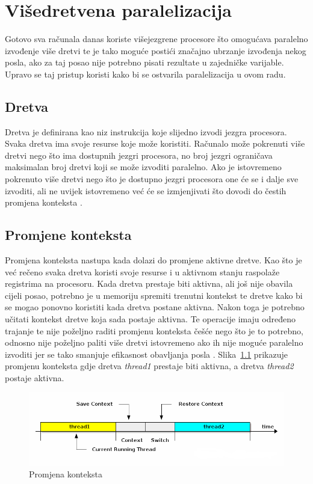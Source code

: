 \documentclass[times, utf8, zavrsni]{fer}
\begin{document}
\chapter{Višedretvena paralelizacija}
Gotovo sva računala danas koriste višejezgrene procesore što omogućava paralelno izvođenje više dretvi te je tako moguće postići značajno ubrzanje izvođenja nekog posla, ako za taj posao nije potrebno pisati rezultate u zajedničke varijable. Upravo se taj pristup koristi kako bi se ostvarila paralelizacija u ovom radu.

\section{Dretva}
Dretva je definirana kao niz instrukcija koje slijedno izvodi jezgra procesora. Svaka dretva ima svoje resurse koje može koristiti. Računalo može pokrenuti više dretvi nego što ima dostupnih jezgri procesora, no broj jezgri ograničava maksimalan broj dretvi koji se može izvoditi paralelno. Ako je istovremeno pokrenuto više dretvi nego što je dostupno jezgri procesora one će se i dalje sve izvoditi, ali ne uvijek istovremeno već će se izmjenjivati što dovodi do čestih promjena konteksta \citep{os}.

\section{Promjene konteksta}
Promjena konteksta  nastupa kada dolazi do promjene aktivne dretve. Kao što je već rečeno svaka dretva koristi svoje resurse i u aktivnom stanju raspolaže registrima na procesoru. Kada dretva prestaje biti aktivna, ali još nije obavila cijeli posao, potrebno je u memoriju spremiti trenutni kontekst te dretve kako bi se mogao ponovno koristiti kada dretva postane aktivna. Nakon toga je potrebno učitati kontekst dretve koja sada postaje aktivna. Te operacije imaju određeno trajanje te nije poželjno raditi promjenu konteksta češće nego što je to potrebno, odnosno nije poželjno paliti više dretvi istovremeno ako ih nije moguće paralelno izvoditi jer se tako smanjuje efikasnost obavljanja posla \citep{os}. Slika~\ref{fig:contextSwitching} prikazuje promjenu konteksta gdje dretva \textit{thread1} prestaje biti aktivna, a dretva \textit{thread2} postaje aktivna.

\begin{figure}[htb]
	\centering
	\includegraphics[width=\linewidth]{figures/contextSwitching.png}
	\caption{Promjena konteksta\protect\footnotemark}
	\label{fig:contextSwitching}
\end{figure}
\end{document}
